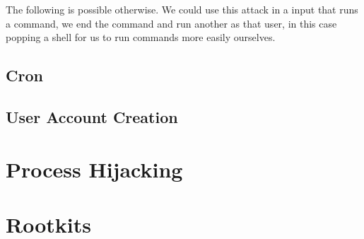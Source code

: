 The following is possible otherwise. We could use this attack in a input that runs a command, we end the command and run another as that user, in this case popping a shell for us to run commands more easily ourselves.

\subsection{Cron}
\subsection{User Account Creation}
\section{Process Hijacking}
\section{Rootkits}







